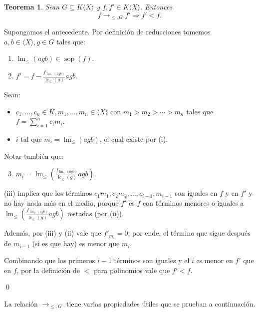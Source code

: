 \documentclass[12pt]{report}
\theoremstyle{customstyle}
\newtheorem{theorem}{Teorema}[chapter]
\renewenvironment{proof}[1][\proofname]{{\noindent \bfseries #1: }}{\qed} %
\theoremstyle{factstyle}
\DeclareMathOperator{\sop}{sop}
\DeclareMathOperator{\lm}{lm}
\DeclareMathOperator{\lc}{lc}
\begin{document}
\begin{theorem}\label{thm:→ achican}
  Sean $G ⊆ K⟨X⟩$ y $f, f' ∈ K⟨X⟩$. Entonces
  \[ f →_{≤, G} f' ⇒ f' < f \text{.} \]
\end{theorem}
\begin{proof}
  Supongamos el antecedente. Por definición de reducciones tomemos $a, b ∈ ⟨X⟩, g ∈ G$ tales que:
  \begin{enumerate}[label=(\roman*)]
    \item $\lm_≤(agb) ∈ \sop(f)$.
    \item $f' = f - \frac{f_{\lm_≤(agb)}}{\lc_≤(g)}agb$.
  \end{enumerate}

  Sean:
  \begin{itemize}
    \item $c_1, …, c_n ∈ K, m_1, …, m_n ∈ ⟨X⟩$ con $m_1 > m_2 > ⋯ > m_n$ tales que $f = ∑_{i = 1}^n c_i m_i$.
    \item $i$ tal que $m_i = \lm_≤(agb)$, el cual existe por (i).
  \end{itemize}

  Notar también que:

  \begin{enumerate}[label=(\roman*)]
    \setcounter{enumi}{2}
    \item $m_i = \lm_≤(\frac{f_{\lm_≤(agb)}}{\lc_≤(g)}agb)$.
  \end{enumerate}

  (iii) implica que los términos $c_1 m_1, c_2 m_2, …, c_{i-1}, m_{i-1}$ son iguales en $f$ y en $f'$ y no hay nada más en el medio, porque $f'$ es $f$ con términos menores o iguales a $\lm_≤(\frac{f_{\lm_≤(agb)}}{\lc_≤(g)}agb)$ restadas (por (ii)).

  Además, por (iii) y (ii) vale que $f'_{m_i} = 0$, por ende, el término que sigue después de $m_{i-1}$ (si es que hay) es menor que $m_i$.

  Combinando que los primeros $i - 1$ términos son iguales y el $i$ es menor en $f'$ que en $f$, por la definición de $<$ para polinomios vale que $f' < f$.

\end{proof}

La relación $→_{≤, G}$ tiene varias propiedades útiles que se prueban a continuación.
\end{document}
